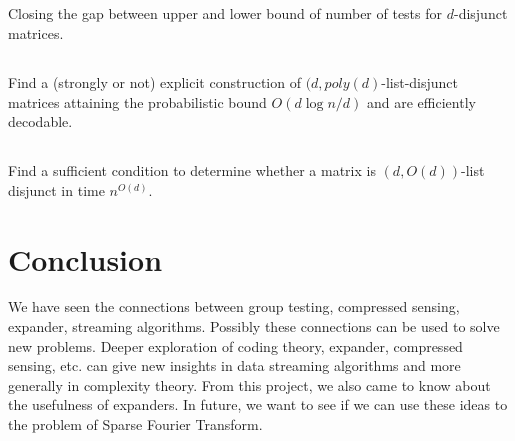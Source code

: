 \documentclass{article}
\begin{document}
\subsection{}
Closing the gap between upper and lower bound of number of tests for $d$-disjunct matrices.

\subsection{}
Find a (strongly or not) explicit construction of $(d,poly(d)$-list-disjunct matrices
attaining the probabilistic bound $O(d\log{n/d})$ and are efficiently decodable.

\subsection{}
Find a sufficient condition to determine whether a matrix is $(d,O(d))$-list disjunct in time $n^{O(d)}$.

\section{Conclusion}

We have seen the connections between group testing, compressed sensing, expander,
streaming algorithms. Possibly these connections can be used to solve new problems.
Deeper exploration of coding theory, expander, compressed sensing, etc. can give new
insights in data streaming algorithms and more generally in complexity theory. From
this project, we also came to know about the usefulness of expanders. In future,
we want to see if we can use these ideas to the problem of Sparse Fourier Transform.



\end{document}
